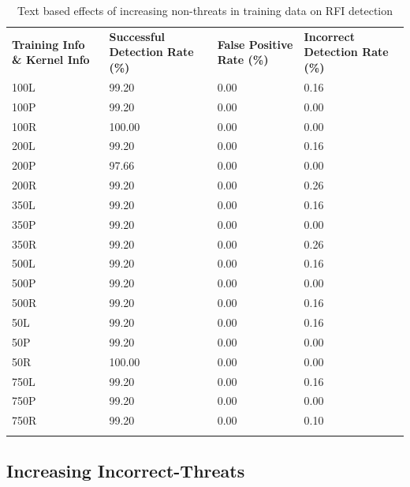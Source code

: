 \begin{appendices}
\begin{longtable}{|p{1.5in}|p{1in}|p{1in}|p{1in}|}
	\hline
	\textbf{Training Info \& Kernel Info} & \textbf{Successful Detection Rate (\%)} & \textbf{False Positive Rate (\%)} & \textbf{Incorrect Detection Rate (\%)}  \\
	\hhline{|=|=|=|=|}
	100L &  99.20 &  0.00 &  0.16 \\ \hline
	100P &  99.20 &  0.00 &  0.00 \\ \hline
	100R & 100.00 &  0.00 &  0.00 \\ \hline
	200L &  99.20 &  0.00 &  0.16 \\ \hline
	200P &  97.66 &  0.00 &  0.00 \\ \hline
	200R &  99.20 &  0.00 &  0.26 \\ \hline
	350L &  99.20 &  0.00 &  0.16 \\ \hline
	350P &  99.20 &  0.00 &  0.00 \\ \hline
	350R &  99.20 &  0.00 &  0.26 \\ \hline
	500L &  99.20 &  0.00 &  0.16 \\ \hline
	500P &  99.20 &  0.00 &  0.00 \\ \hline
	500R &  99.20 &  0.00 &  0.16 \\ \hline
 	50L &  99.20 &  0.00 &  0.16 \\ \hline
 	50P &  99.20 &  0.00 &  0.00 \\ \hline
 	50R & 100.00 &  0.00 &  0.00 \\ \hline
	750L &  99.20 &  0.00 &  0.16 \\ \hline
	750P &  99.20 &  0.00 &  0.00 \\ \hline
	750R &  99.20 &  0.00 &  0.10 \\ \hline
	\caption{Text based effects of increasing non-threats in training data on RFI detection}
\end{longtable}

\newpage
\subsection{Increasing Incorrect-Threats}


\end{appendices}
